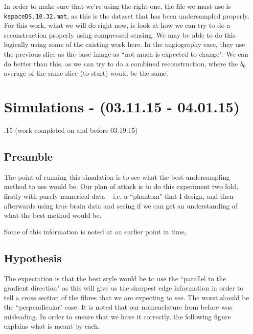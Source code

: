 \documentclass[11 pt]{article}
\let\oldsection\section
\renewcommand\section{\clearpage\newpage\oldsection}
\begin{document}
    In order to make sure that we're using the right one, the file we must use is \verb!kspaceDS.10.32.mat!, as this is the dataset that has been undersampled properly. For this work, what we will do right now, is look at how we can try to do a reconstruction properly using compressed sensing. We may be able to do this logically using some of the existing work here. In the angiography case, they use the previous slice as the base image as ``not much is expected to change". We can do better than this, as we can try to do a combined reconstruction, where the $b_0$ average of the same slice (to start) would be the same. 



\section{Simulations - (03.11.15 - 04.01.15)}
  .15 (work completed on and before 03.19.15)
  
  \subsection{Preamble}

    The point of running this simulation is to see what the best undersampling method to use would be. Our plan of attack is to do this experiment two fold, firstly with purely numerical data -- i.e. a ``phantom" that I design, and then afterwards using true brain data and seeing if we can get an understanding of what the best method would be. 
    
    Some of this information is noted at an earlier point in time, 

  \subsection{Hypothesis}

    The expectation is that the best style would be to use the ``parallel to the gradient direction" as this will give us the sharpest edge information in order to tell a cross section of the fibres that we are expecting to see. The worst should be the ``perpendicular" case. It is noted that our nomenclature from before was misleading. In order to ensure that we have it correctly, the following figure explains what is meant by each.
\end{document}
